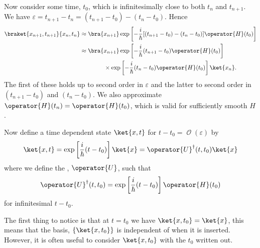 \documentclass[fleqn]{NotesClass}
\newcommand*{\hermit}{\dagger}
\newcommand*{\order}{\mathop{\mathcal{O}}}
\begin{document}
    Now consider some time, \(t_0\), which is infinitesimally close to both \(t_n\) and \(t_{n+1}\).
    We have \(\varepsilon = t_{n+1} - t_n = (t_{n+1} - t_0) - (t_n - t_0)\).
    Hence
    \begin{align}
        \braket{x_{n+1}, t_{n+1}}{x_n, t_n} &\approx \bra{x_{n+1}} \exp\left[ -\frac{i}{\hbar}[(t_{n+1} - t_0) - (t_n - t_0)]\operator{H}(t_0) \right]\\
        &\approx \bra{x_{n+1}} \exp\left[ -\frac{i}{\hbar}(t_{n+1} - t_0)\operator{H}(t_0) \right]\notag\\
        &\qquad\qquad\times\exp\left[ -\frac{i}{\hbar}(t_n - t_0)\operator{H}(t_0) \right] \ket{x_n}.
    \end{align}
    The first of these holds up to second order in \(\varepsilon\) and the latter to second order in \((t_{n+1} - t_0)\) and \((t_n - t_0)\).
    We also approximate \(\operator{H}(t_n) = \operator{H}(t_0)\), which is valid for sufficiently smooth \(H\).
    
    Now define a time dependent state \(\ket{x, t}\) for \(t - t_0 = \order(\varepsilon)\) by
    \begin{equation}
        \ket{x, t} = \exp\left[ \frac{i}{\hbar}(t - t_0) \right]\ket{x} = \operator{U}^\hermit(t, t_0)\ket{x}
    \end{equation}
    where we define the , \(\operator{U}\), such that
    \begin{equation}
        \operator{U}^\hermit(t, t_0) = \exp\left[ \frac{i}{\hbar}(t - t_0) \right]\operator{H}(t_0)
    \end{equation}
    for infinitesimal \(t - t_0\).
    
    The first thing to notice is that at \(t = t_0\) we have \(\ket{x, t_0} = \ket{x}\), this means that the basis, \(\{\ket{x, t_0}\}\) is independent of when it is inserted.
    However, it is often useful to consider \(\ket{x, t_0}\) with the \(t_0\) written out.
    
\end{document}
